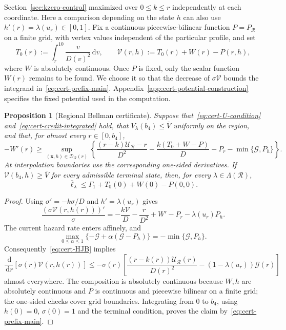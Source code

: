 \documentclass[11pt]{article}
\newtheorem{proposition}[theorem]{Proposition}
\theoremstyle{definition}
\theoremstyle{remark}
\newcommand{\dd}{\,\mathrm d}
\begin{document}
Section~\ref{sec:kzero-control} maximized over $0\le k\le r$
independently at each coordinate.  Here a comparison depending on the
state $h$ can also use $h'(r)=\lambda(u_r)\in[0,1]$.
Fix a continuous piecewise-bilinear function $P=P_{\mathcal R}$ on a
finite grid, with vertex values independent of the particular profile,
and set
\[
 T_0(r):=\int_r^{10}\frac{v}{D(v)^2}\dd v,
 \qquad
 \mathcal V(r,h):=T_0(r)+W(r)-P(r,h),
\]
where $W$ is absolutely continuous.  Once $P$ is fixed, only the scalar
function $W(r)$ remains to be found.  We choose it so that the decrease
of $\sigma\mathcal V$ bounds the integrand in~\eqref{eq:cert-prefix-main}.
Appendix~\ref{app:cert-potential-construction} specifies the fixed
potential used in the computation.

\begin{proposition}[Regional Bellman certificate]
\label{prop:cert-bellman}
Suppose that~\eqref{eq:cert-U-condition} and~\eqref{eq:cert-credit-integrated}
hold, that $V_\lambda(b_4)\le\overline V$ uniformly on the region,
and that, for almost every $r\in[0,b_4]$,
\begin{equation}\label{eq:cert-HJB}
 -W'(r)\ge
 \sup_{(\mathbf x,h)\in\mathcal D_{\mathcal R}(r)}
 \left\{
 \frac{(r-k)\mathcal U_{\mathcal R}-r}{D^2}
 -\frac{k(T_0+W-P)}{D}
 -P_r-\min\{\mathcal G,P_h\}
 \right\}.
\end{equation}
At interpolation boundaries use the corresponding one-sided derivatives.
If $\mathcal V(b_4,h)\ge\overline V$ for every admissible terminal state,
then, for every $\lambda\in\Lambda(\mathcal R)$,
\begin{equation}\label{eq:cert-bellman-result}
 \overline\ell_\lambda
 \le\Gamma_1+T_0(0)+W(0)-P(0,0).
\end{equation}
\end{proposition}

\begin{proof}
Using $\sigma'=-k\sigma/D$ and $h'=\lambda(u_r)$ gives
\begin{equation}\label{eq:cert-bellman-derivative}
 \frac{(\sigma\mathcal V(r,h(r)))'}{\sigma}
 =-\frac{k\mathcal V}{D}-\frac r{D^2}
   +W'-P_r-\lambda(u_r)P_h.
\end{equation}
The current hazard rate enters affinely, and
\begin{equation}\label{eq:cert-control-max}
 \max_{0\le\alpha\le1}
 \{-\mathcal G+\alpha(\mathcal G-P_h)\}
 =-\min\{\mathcal G,P_h\}.
\end{equation}
Consequently~\eqref{eq:cert-HJB} implies
\[
 \frac{\dd}{\dd r}[\sigma(r)\mathcal V(r,h(r))]
 \le-\sigma(r)\left[
 \frac{(r-k(r))\mathcal U_{\mathcal R}(r)}{D(r)^2}
 -(1-\lambda(u_r))\mathcal G(r)\right]
\]
almost everywhere.  The composition is absolutely continuous because
$W,h$ are absolutely continuous and $P$ is continuous and piecewise
bilinear on a finite grid; the one-sided checks cover grid boundaries.
Integrating from $0$ to $b_4$, using $h(0)=0$, $\sigma(0)=1$ and the
terminal condition, proves the claim by~\eqref{eq:cert-prefix-main}.
\end{proof}
\end{document}
